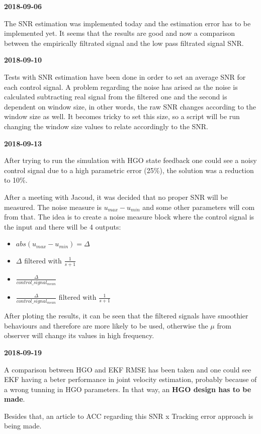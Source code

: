 \textbf{2018-09-06}

The SNR estimation was implemented today and the estimation error has to be implemented yet. It seems that the results are good and now a comparison between the empirically filtrated signal and the low pass filtrated signal SNR.

\textbf{2018-09-10}

Tests with SNR estimation have been done in order to set an average SNR for each control signal. A problem regarding the noise has arised as the noise is calculated subtracting real signal from the filtered one and the second is dependent on window size, in other words, the raw SNR changes according to the window size as well. It becomes tricky to set this size, so a script will be run changing the window size values to relate accordingly to the SNR.

\textbf{2018-09-13}

After trying to run the simulation with HGO state feedback one could see a noisy control signal due to a high parametric error (25\%), the solution was a reduction to 10\%.

After a meeting with Jacoud, it was decided that no proper SNR will be measured. The noise measure is $u_{max} - u_{min}$ and some other parameters will com from that. The idea is to create a noise measure block where the control signal is the input and there will be 4 outputs:
\begin{itemize}
    \item $abs(u_{max} - u_{min}) = \Delta$
    \item $\Delta$ filtered with $\frac{1}{s + 1}$
    \item $\frac{\Delta}{control\_signal_{mean}}$
    \item $\frac{\Delta}{control\_signal_{mean}}$ filtered with $\frac{1}{s + 1}$
\end{itemize}

After ploting the results, it can be seen that the filtered signals have smoothier behaviours and therefore are more likely to be used, otherwise the $\mu$ from observer will change its values in high frequency.

\textbf{2018-09-19}

A comparison between HGO and EKF RMSE has been taken and one could see EKF having a beter performance in joint velocity estimation, probably because of a wrong tunning in HGO parameters. In that way, an \textbf{HGO design has to be made}.

Besides that, an article to ACC regarding this SNR x Tracking error approach is being made.

